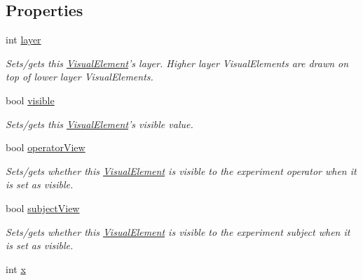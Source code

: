 \subsection*{Properties}
\begin{DoxyCompactItemize}
\item 
\hypertarget{struct_picto_1_1_visual_element_acad7fb65649363c5bb3a36ac012f4015}{int \hyperlink{struct_picto_1_1_visual_element_acad7fb65649363c5bb3a36ac012f4015}{layer}}\label{struct_picto_1_1_visual_element_acad7fb65649363c5bb3a36ac012f4015}

\begin{DoxyCompactList}\small\item\em Sets/gets this \hyperlink{struct_picto_1_1_visual_element}{Visual\-Element}'s layer. Higher layer Visual\-Elements are drawn on top of lower layer Visual\-Elements. \end{DoxyCompactList}\item 
bool \hyperlink{struct_picto_1_1_visual_element_a81a6de4e406cc6e3d8c7ac6398334d6c}{visible}
\begin{DoxyCompactList}\small\item\em Sets/gets this \hyperlink{struct_picto_1_1_visual_element}{Visual\-Element}'s visible value. \end{DoxyCompactList}\item 
\hypertarget{struct_picto_1_1_visual_element_a963d35c5bd3582ac5f5309332f743a86}{bool \hyperlink{struct_picto_1_1_visual_element_a963d35c5bd3582ac5f5309332f743a86}{operator\-View}}\label{struct_picto_1_1_visual_element_a963d35c5bd3582ac5f5309332f743a86}

\begin{DoxyCompactList}\small\item\em Sets/gets whether this \hyperlink{struct_picto_1_1_visual_element}{Visual\-Element} is visible to the experiment operator when it is set as visible. \end{DoxyCompactList}\item 
\hypertarget{struct_picto_1_1_visual_element_a9e7880f1536bbc1fbf4703bc23e92cee}{bool \hyperlink{struct_picto_1_1_visual_element_a9e7880f1536bbc1fbf4703bc23e92cee}{subject\-View}}\label{struct_picto_1_1_visual_element_a9e7880f1536bbc1fbf4703bc23e92cee}

\begin{DoxyCompactList}\small\item\em Sets/gets whether this \hyperlink{struct_picto_1_1_visual_element}{Visual\-Element} is visible to the experiment subject when it is set as visible. \end{DoxyCompactList}\item 
\hypertarget{struct_picto_1_1_visual_element_a1b50bc5fa41868f661687015be3c97e8}{int \hyperlink{struct_picto_1_1_visual_element_a1b50bc5fa41868f661687015be3c97e8}{x}}\label{struct_picto_1_1_visual_element_a1b50bc5fa41868f661687015be3c97e8}


\end{DoxyCompactItemize}
